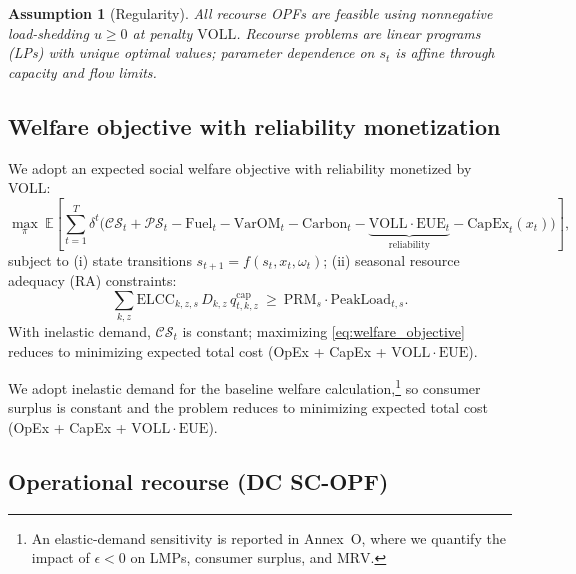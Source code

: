 \documentclass[11pt]{article}
\newcommand{\VOLL}{\ensuremath{\mathrm{VOLL}}}
\newcommand{\EUE}{\ensuremath{\mathrm{EUE}}}
\newcommand{\MRV}{\ensuremath{\mathrm{MRV}}}
\newcommand{\E}{\mathbb{E}}
\numberwithin{equation}{section}
\newtheorem{assumption}{Assumption}[section]
\theoremstyle{definition}
\theoremstyle{remark}
\begin{document}
\begin{assumption}[Regularity]\label{assump:regularity}
All recourse OPFs are feasible using nonnegative load-shedding $u\ge 0$ at penalty $\mathrm{VOLL}$. Recourse problems are linear programs (LPs) with unique optimal values; parameter dependence on $s_t$ is affine through capacity and flow limits.
\end{assumption}

\subsection{ Welfare objective with reliability monetization}

We adopt an expected social welfare objective with reliability monetized by VOLL:
\begin{equation}\label{eq:welfare_objective}
\max_{\pi}\ \E\!\left[\sum_{t=1}^{T}\delta^t\Big(\mathcal{CS}_t+\mathcal{PS}_t
- \mathrm{Fuel}_t - \mathrm{VarOM}_t - \mathrm{Carbon}_t
- \underbrace{\mathrm{VOLL}\cdot \mathrm{EUE}_t}_{\text{reliability}}
- \mathrm{CapEx}_t(x_t)\Big)\right],
\end{equation}
subject to (i) state transitions $s_{t+1}=f(s_t,x_t,\omega_t)$; (ii) seasonal resource adequacy (RA) constraints:
\begin{equation}\label{eq:seasonal_RA}
\sum_{k,z}\mathrm{ELCC}_{k,z,s}\,D_{k,z}\,q^{\mathrm{cap}}_{t,k,z} \ \ge\ \mathrm{PRM}_s\cdot \mathrm{PeakLoad}_{t,s}.
\end{equation}
With inelastic demand, $\mathcal{CS}_t$ is constant; maximizing \eqref{eq:welfare_objective} reduces to minimizing expected total cost (OpEx + CapEx + $\mathrm{VOLL}\cdot\mathrm{EUE}$).

We adopt inelastic demand for the baseline welfare calculation,\footnote{An elastic-demand sensitivity is reported in Annex~O, where we quantify the impact of $\epsilon<0$ on LMPs, consumer surplus, and $\MRV$.} so consumer surplus is constant and the problem reduces to minimizing expected total cost (OpEx + CapEx + $\VOLL\cdot\EUE$).

\subsection{ Operational recourse (DC SC-OPF)}
\label{sec:annexF_recourse}
\end{document}
